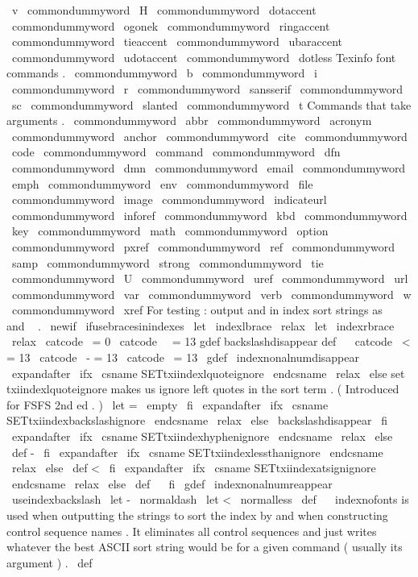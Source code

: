 {{{{{\
v
\
commondummyword
\
H
\
commondummyword
\
dotaccent
\
commondummyword
\
ogonek
\
commondummyword
\
ringaccent
\
commondummyword
\
tieaccent
\
commondummyword
\
ubaraccent
\
commondummyword
\
udotaccent
\
commondummyword
\
dotless
%
%
Texinfo
font
commands
.
\
commondummyword
\
b
\
commondummyword
\
i
\
commondummyword
\
r
\
commondummyword
\
sansserif
\
commondummyword
\
sc
\
commondummyword
\
slanted
\
commondummyword
\
t
%
%
Commands
that
take
arguments
.
\
commondummyword
\
abbr
\
commondummyword
\
acronym
\
commondummyword
\
anchor
\
commondummyword
\
cite
\
commondummyword
\
code
\
commondummyword
\
command
\
commondummyword
\
dfn
\
commondummyword
\
dmn
\
commondummyword
\
email
\
commondummyword
\
emph
\
commondummyword
\
env
\
commondummyword
\
file
\
commondummyword
\
image
\
commondummyword
\
indicateurl
\
commondummyword
\
inforef
\
commondummyword
\
kbd
\
commondummyword
\
key
\
commondummyword
\
math
\
commondummyword
\
option
\
commondummyword
\
pxref
\
commondummyword
\
ref
\
commondummyword
\
samp
\
commondummyword
\
strong
\
commondummyword
\
tie
\
commondummyword
\
U
\
commondummyword
\
uref
\
commondummyword
\
url
\
commondummyword
\
var
\
commondummyword
\
verb
\
commondummyword
\
w
\
commondummyword
\
xref
}
%
For
testing
:
output
{
and
}
in
index
sort
strings
as
\
{
and
\
}
.
\
newif
\
ifusebracesinindexes
\
let
\
indexlbrace
\
relax
\
let
\
indexrbrace
\
relax
{
\
catcode
\
=
0
\
catcode
\
\
=
13
gdef
backslashdisappear
{
def
\
{
}
}
}
{
\
catcode
\
<
=
13
\
catcode
\
-
=
13
\
catcode
\
=
13
\
gdef
\
indexnonalnumdisappear
{
%
\
expandafter
\
ifx
\
csname
SETtxiindexlquoteignore
\
endcsname
\
relax
\
else
%
set
txiindexlquoteignore
makes
us
ignore
left
quotes
in
the
sort
term
.
%
(
Introduced
for
FSFS
2nd
ed
.
)
\
let
=
\
empty
\
fi
%
\
expandafter
\
ifx
\
csname
SETtxiindexbackslashignore
\
endcsname
\
relax
\
else
\
backslashdisappear
\
fi
%
\
expandafter
\
ifx
\
csname
SETtxiindexhyphenignore
\
endcsname
\
relax
\
else
\
def
-
{
}
%
\
fi
\
expandafter
\
ifx
\
csname
SETtxiindexlessthanignore
\
endcsname
\
relax
\
else
\
def
<
{
}
%
\
fi
\
expandafter
\
ifx
\
csname
SETtxiindexatsignignore
\
endcsname
\
relax
\
else
\
def
\
{
}
%
\
fi
}
\
gdef
\
indexnonalnumreappear
{
%
\
useindexbackslash
\
let
-
\
normaldash
\
let
<
\
normalless
\
def
\
{
}
%
}
}
%
\
indexnofonts
is
used
when
outputting
the
strings
to
sort
the
index
%
by
and
when
constructing
control
sequence
names
.
It
eliminates
all
%
control
sequences
and
just
writes
whatever
the
best
ASCII
sort
string
%
would
be
for
a
given
command
(
usually
its
argument
)
.
%
\
def
\
}}}}
